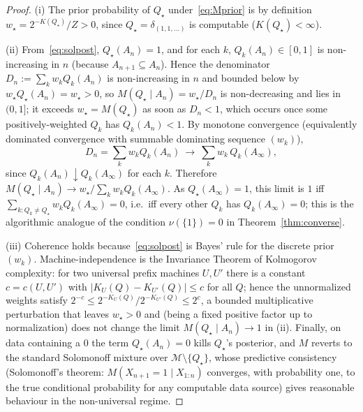 \documentclass{amsart}
\theoremstyle{definition}
\begin{document}
\begin{proof}
(i) The prior probability of $Q_\star$ under~\eqref{eq:Mprior} is by definition
$w_\star=2^{-K(Q_\star)}/Z>0$, since $Q_\star=\delta_{(1,1,\dots)}$ is computable
($K(Q_\star)<\infty$).

(ii) From~\eqref{eq:solpost}, $Q_\star(A_n)=1$, and for each $k$,
$Q_k(A_n)\in[0,1]$ is non-increasing in $n$ (because $A_{n+1}\subseteq A_n$).
Hence the denominator $D_n:=\sum_k w_k Q_k(A_n)$ is non-increasing in $n$ and
bounded below by $w_\star Q_\star(A_n)=w_\star>0$, so
$M(Q_\star\mid A_n)=w_\star/D_n$ is non-decreasing and lies in $(0,1]$; it
exceeds $w_\star=M(Q_\star)$ as soon as $D_n<1$, which occurs once some
positively-weighted $Q_k$ has $Q_k(A_n)<1$. By monotone convergence
(equivalently dominated convergence with summable dominating sequence $(w_k)$),
\[
  D_n=\sum_k w_k Q_k(A_n)\ \longrightarrow\ \sum_k w_k\,Q_k(A_\infty),
\]
since $Q_k(A_n)\downarrow Q_k(A_\infty)$ for each $k$. Therefore
$M(Q_\star\mid A_n)\to w_\star/\sum_k w_k Q_k(A_\infty)$. As
$Q_\star(A_\infty)=1$, this limit is $1$ iff
$\sum_{k:Q_k\ne Q_\star} w_k Q_k(A_\infty)=0$, i.e.\ iff every other $Q_k$ has
$Q_k(A_\infty)=0$; this is the algorithmic analogue of the condition
$\nu(\{1\})=0$ in Theorem~\ref{thm:converse}.

(iii) Coherence holds because~\eqref{eq:solpost} is Bayes' rule for the discrete
prior $(w_k)$. Machine-independence is the Invariance Theorem of Kolmogorov
complexity: for two universal prefix machines $U,U'$ there is a constant
$c=c(U,U')$ with $|K_U(Q)-K_{U'}(Q)|\le c$ for all $Q$; hence the unnormalized
weights satisfy $2^{-c}\le 2^{-K_U(Q)}/2^{-K_{U'}(Q)}\le 2^{c}$, a bounded
multiplicative perturbation that leaves $w_\star>0$ and (being a fixed positive
factor up to normalization) does not change the limit
$M(Q_\star\mid A_n)\to1$ in (ii). Finally, on data containing a $0$ the term
$Q_\star(A_n)=0$ kills $Q_\star$'s posterior, and $M$ reverts to the standard
Solomonoff mixture over $\mathcal M\setminus\{Q_\star\}$, whose predictive
consistency (Solomonoff's theorem: $M(X_{n+1}=1\mid X_{1:n})$ converges, with
probability one, to the true conditional probability for any computable data
source) gives reasonable behaviour in the non-universal regime.
\end{proof}
\end{document}
